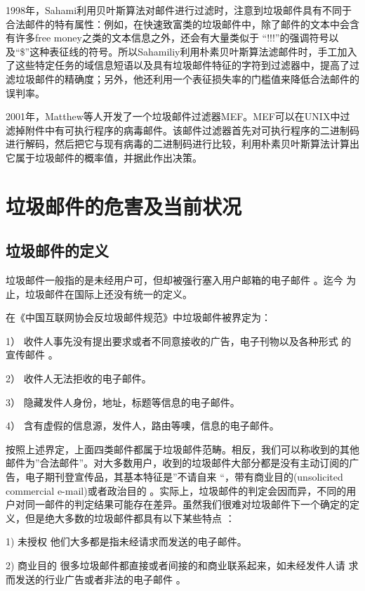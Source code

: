   1998年，Sahami利用贝叶斯算法对邮件进行过滤时，注意到垃圾邮件具有不同于合法邮件的特有属性：例如，在快速致富类的垃圾邮件中，除了邮件的文本中会含有许多free  money之类的文本信息之外，还会有大量类似于 “!!!”的强调符号以及“\$”这种表征线的符号。所以Sahamiliy利用朴素贝叶斯算法滤邮件时，手工加入了这些特定任务的域信息短语以及具有垃圾邮件特征的字符到过滤器中，提高了过滤垃圾邮件的精确度；另外，他还利用一个表征损失率的门槛值来降低合法邮件的误判率。      
  
  2001年，Matthew等人开发了一个垃圾邮件过滤器MEF。MEF可以在UNIX中过 滤掉附件中有可执行程序的病毒邮件。该邮件过滤器首先对可执行程序的二进制码进行解码，然后把它与现有病毒的二进制码进行比较，利用朴素贝叶斯算法计算出它属于垃圾邮件的概率值，并据此作出决策。
 
\section{垃圾邮件的危害及当前状况}
\subsection{垃圾邮件的定义}
垃圾邮件一般指的是未经用户可，但却被强行塞入用户邮箱的电子邮件 。迄今 为止，垃圾邮件在国际上还没有统一的定义。 

      在《中国互联网协会反垃圾邮件规范》中垃圾邮件被界定为：
      
        1）  收件人事先没有提出要求或者不同意接收的广告，电子刊物以及各种形式 的宣传邮件 。  
        
        2） 收件人无法拒收的电子邮件。  
        
        3） 隐藏发件人身份，地址，标题等信息的电子邮件。
        
         4） 含有虚假的信息源，发件人，路由等噢，信息的电子邮件。  
         
         按照上述界定，上面四类邮件都属于垃圾邮件范畴。相反，我们可以称收到的其他邮件为”合法邮件”。对大多数用户，收到的垃圾邮件大部分都是没有主动订阅的广告，电子期刊登宣传品，其基本特征是”不请自来 “，带有商业目的(unsolicited commercial e-mail)或者政治目的 。实际上，垃圾邮件的判定会因而异，不同的用户对同一邮件的判定结果可能存在差异。虽然我们很难对垃圾邮件下一个确定的定义，但是绝大多数的垃圾邮件都具有以下某些特点 ：
         
           1)  未授权   他们大多都是指未经请求而发送的电子邮件。 
           
            2)  商业目的  很多垃圾邮件都直接或者间接的和商业联系起来，如未经发件人请 求而发送的行业广告或者非法的电子邮件 。  
            
